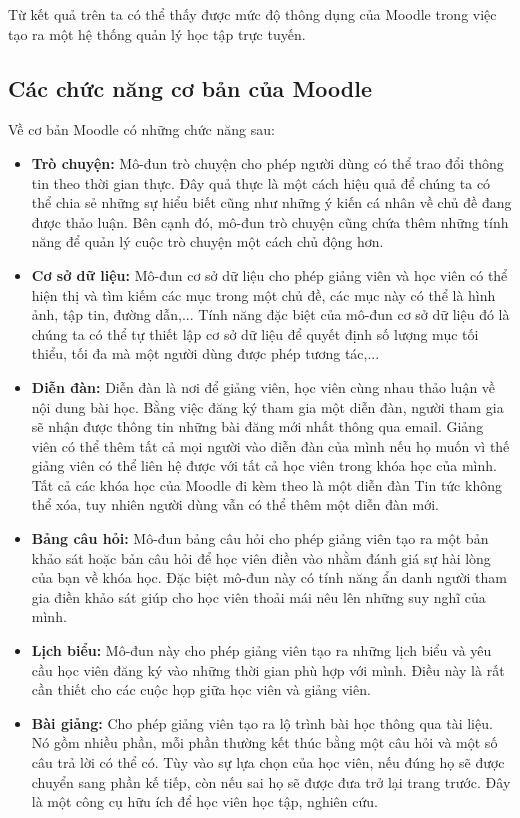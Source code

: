 Từ kết quả trên ta có thể thấy được mức độ thông dụng của Moodle trong việc tạo ra một hệ thống quản lý học tập trực tuyến.
\subsection{Các chức năng cơ bản của Moodle}

Về cơ bản Moodle có những chức năng \cite{featuremoodle} sau:

\begin{itemize}
	\item {\bf Trò chuyện:} Mô-đun trò chuyện cho phép người dùng có thể trao đổi thông tin theo thời gian thực. Đây quả thực là một cách hiệu quả để chúng ta có thể chia sẻ những sự hiểu biết cũng như những ý kiến cá nhân về chủ đề đang được thảo luận. Bên cạnh đó, mô-đun trò chuyện cũng chứa thêm những tính năng để quản lý cuộc trò chuyện một cách chủ động hơn.
	\item {\bf Cơ sở dữ liệu:} Mô-đun cơ sở dữ liệu cho phép giảng viên và học viên có thể hiện thị và tìm kiếm các mục trong một chủ đề, các mục này có thể là hình ảnh, tập tin, đường dẫn,... Tính năng đặc biệt của mô-đun cơ sở dữ liệu đó là chúng ta có thể tự thiết lập cơ sở dữ liệu để quyết định số lượng mục tối thiểu, tối đa mà một người dùng được phép tương tác,...
	\item {\bf Diễn đàn:} Diễn đàn là nơi để giảng viên, học viên cùng nhau thảo luận về nội dung bài học. Bằng việc đăng ký tham gia một diễn đàn, người tham gia sẽ nhận được thông tin những bài đăng mới nhất thông qua email. Giảng viên có thể thêm tất cả mọi người vào diễn đàn của mình nếu họ muốn vì thế giảng viên có thể liên hệ được với tất cả học viên trong khóa học của mình. Tất cả các khóa học của Moodle đi kèm theo là một diễn đàn Tin tức không thể xóa, tuy nhiên người dùng vẫn có thể thêm một diễn đàn mới.
	\item {\bf Bảng câu hỏi:} Mô-đun bảng câu hỏi cho phép giảng viên tạo ra một bản khảo sát hoặc bản câu hỏi để học viên điền vào nhằm đánh giá sự hài lòng của bạn về khóa học. Đặc biệt mô-đun này có tính năng ẩn danh người tham gia điền khảo sát giúp cho học viên thoải mái nêu lên những suy nghĩ của mình.
	\item {\bf Lịch biểu:} Mô-đun này cho phép giảng viên tạo ra những lịch biểu và yêu cầu học viên đăng ký vào những thời gian phù hợp với mình. Điều này là rất cần thiết cho các cuộc họp giữa học viên và giảng viên.
	\item {\bf Bài giảng:} Cho phép giảng viên tạo ra lộ trình bài học thông qua tài liệu. Nó gồm nhiều phần, mỗi phần thường kết thúc bằng một câu hỏi và một số câu trả lời có thể có. Tùy vào sự lựa chọn của học viên, nếu đúng họ sẽ được chuyển sang phần kế tiếp, còn nếu sai họ sẽ được đưa trở lại trang trước. Đây là một công cụ hữu ích để học viên học tập, nghiên cứu.

\end{itemize}
